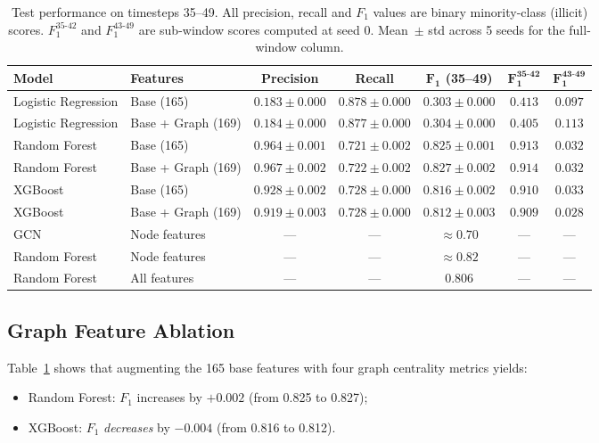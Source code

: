 \documentclass[conference]{IEEEtran}
\begin{document}
\begin{table}[t]
\centering
\caption{%
  Test performance on timesteps 35--49.
  All precision, recall and $F_1$ values are binary minority-class
  (illicit) scores.
  $F_1^{35\text{-}42}$ and $F_1^{43\text{-}49}$ are sub-window scores
  computed at seed 0.
  Mean~$\pm$ std across 5 seeds for the full-window column.
}
\label{tab:baselines}
\renewcommand{\arraystretch}{1.3}
\begin{tabular}{@{}llccccc@{}}
\toprule
\textbf{Model} & \textbf{Features} & \textbf{Precision} & \textbf{Recall}
  & $\boldsymbol{F_1}$ \textbf{(35--49)} & $\boldsymbol{F_1^{35\text{-}42}}$
  & $\boldsymbol{F_1^{43\text{-}49}}$ \\
\midrule
Logistic Regression & Base (165)        & $0.183 \pm 0.000$ & $0.878 \pm 0.000$
  & $0.303 \pm 0.000$ & $0.413$ & $0.097$ \\
Logistic Regression & Base + Graph (169)& $0.184 \pm 0.000$ & $0.877 \pm 0.000$
  & $0.304 \pm 0.000$ & $0.405$ & $0.113$ \\
\midrule
Random Forest       & Base (165)        & $0.964 \pm 0.001$ & $0.721 \pm 0.002$
  & $0.825 \pm 0.001$ & $0.913$ & $0.032$ \\
Random Forest       & Base + Graph (169)& $0.967 \pm 0.002$ & $0.722 \pm 0.002$
  & $\mathbf{0.827 \pm 0.002}$ & $\mathbf{0.914}$ & $0.032$ \\
\midrule
XGBoost             & Base (165)        & $0.928 \pm 0.002$ & $0.728 \pm 0.000$
  & $0.816 \pm 0.002$ & $0.910$ & $0.033$ \\
XGBoost             & Base + Graph (169)& $0.919 \pm 0.003$ & $0.728 \pm 0.000$
  & $0.812 \pm 0.003$ & $0.909$ & $0.028$ \\
\midrule
GCN \cite{weber2019anti}         & Node features & --- & --- & ${\approx}0.70$ & --- & --- \\
Random Forest \cite{weber2019anti}& Node features & --- & --- & ${\approx}0.82$ & --- & --- \\
Random Forest \cite{adnan2026statistical} & All features & --- & --- & $0.806$ & --- & --- \\
\bottomrule
\end{tabular}
\end{table}

\subsection{Graph Feature Ablation}

Table~\ref{tab:baselines} shows that augmenting the 165 base features with
four graph centrality metrics yields:
\begin{itemize}
  \item Random Forest: $F_1$ increases by $+0.002$ (from 0.825 to 0.827);
  \item XGBoost: $F_1$ \emph{decreases} by $-0.004$ (from 0.816 to 0.812).
\end{itemize}
\end{document}
